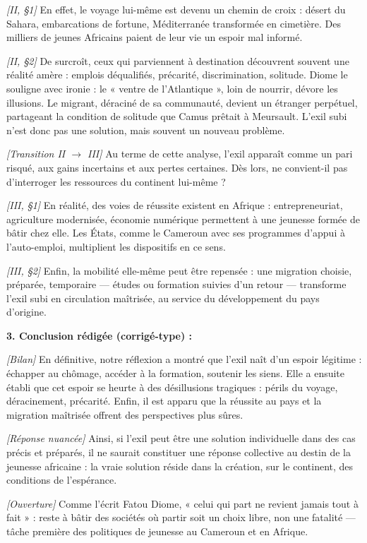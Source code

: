 \documentclass[11pt]{article}
\begin{document}
\begin{corrige}
\emph{[II, §1]} En effet, le voyage lui-même est devenu un chemin de croix : désert du Sahara, embarcations de fortune, Méditerranée transformée en cimetière. Des milliers de jeunes Africains paient de leur vie un espoir mal informé.

\emph{[II, §2]} De surcroît, ceux qui parviennent à destination découvrent souvent une réalité amère : emplois déqualifiés, précarité, discrimination, solitude. Diome le souligne avec ironie : le « ventre de l'Atlantique », loin de nourrir, dévore les illusions. Le migrant, déraciné de sa communauté, devient un étranger perpétuel, partageant la condition de solitude que Camus prêtait à Meursault. L'exil subi n'est donc pas une solution, mais souvent un nouveau problème.

\emph{[Transition II $\to$ III]} Au terme de cette analyse, l'exil apparaît comme un pari risqué, aux gains incertains et aux pertes certaines. Dès lors, ne convient-il pas d'interroger les ressources du continent lui-même ?

\emph{[III, §1]} En réalité, des voies de réussite existent en Afrique : entrepreneuriat, agriculture modernisée, économie numérique permettent à une jeunesse formée de bâtir chez elle. Les États, comme le Cameroun avec ses programmes d'appui à l'auto-emploi, multiplient les dispositifs en ce sens.

\emph{[III, §2]} Enfin, la mobilité elle-même peut être repensée : une migration choisie, préparée, temporaire — études ou formation suivies d'un retour — transforme l'exil subi en circulation maîtrisée, au service du développement du pays d'origine.

\textbf{3. Conclusion rédigée (corrigé-type) :}

\emph{[Bilan]} En définitive, notre réflexion a montré que l'exil naît d'un espoir légitime : échapper au chômage, accéder à la formation, soutenir les siens. Elle a ensuite établi que cet espoir se heurte à des désillusions tragiques : périls du voyage, déracinement, précarité. Enfin, il est apparu que la réussite au pays et la migration maîtrisée offrent des perspectives plus sûres.

\emph{[Réponse nuancée]} Ainsi, si l'exil peut être une solution individuelle dans des cas précis et préparés, il ne saurait constituer une réponse collective au destin de la jeunesse africaine : la vraie solution réside dans la création, sur le continent, des conditions de l'espérance.

\emph{[Ouverture]} Comme l'écrit Fatou Diome, « celui qui part ne revient jamais tout à fait » : reste à bâtir des sociétés où partir soit un choix libre, non une fatalité — tâche première des politiques de jeunesse au Cameroun et en Afrique.


\end{corrige}
\end{document}
